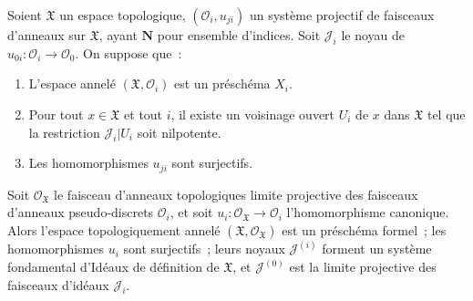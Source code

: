 \begin{proposition}[10.6.3]
\label{I.10.6.3-fr}
Soient $\mathfrak{X}$ un espace topologique,
$(\mathscr{O}_i,u_{ji})$ un système projectif de faisceaux d'anneaux sur
$\mathfrak{X}$, ayant $\mathbf{N}$ pour ensemble d'indices. Soit
$\mathscr{J}_i$ le noyau de
$u_{0i}:\mathscr{O}_i\to\mathscr{O}_0$. On suppose que~:
\begin{enumerate}
  \item[\textup{a)}] L'espace annelé $(\mathfrak{X},\mathscr{O}_i)$ est un
    préschéma $X_i$.
  \item[\textup{b)}] Pour tout $x\in\mathfrak{X}$ et tout $i$, il existe un voisinage
    ouvert $U_i$ de $x$ dans $\mathfrak{X}$ tel que la restriction
    $\mathscr{J}_i|U_i$ soit nilpotente.
  \item[\textup{c)}] Les homomorphismes $u_{ji}$ sont surjectifs.
\end{enumerate}


Soit $\mathscr{O}_{\mathfrak{X}}$ le faisceau d'anneaux topologiques
limite projective des faisceaux d'anneaux pseudo-discrets
$\mathscr{O}_i$, et soit
$u_i:\mathscr{O}_{\mathfrak{X}}\to\mathscr{O}_i$ l'homomorphisme
canonique. Alors l'espace topologiquement annelé
$(\mathfrak{X},\mathscr{O}_{\mathfrak{X}})$ est un préschéma formel~;
les homomorphismes $u_i$ sont surjectifs~; leurs noyaux
$\mathscr{J}^{(i)}$ forment un système fondamental d'Idéaux de définition
de $\mathfrak{X}$, et $\mathscr{J}^{(0)}$ est la limite projective des
faisceaux d'idéaux $\mathscr{J}_i$.
\end{proposition}

